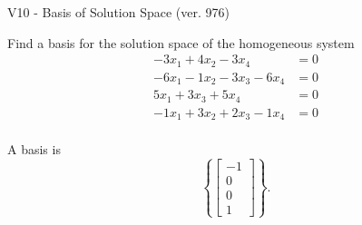 \begin{exercise}
  \begin{exerciseTitle}V10 - Basis of Solution Space (ver. 976)\end{exerciseTitle}
  \begin{exerciseStatement}
    Find a basis for the solution space of the homogeneous system 
\begin{align*}
 -3 x_ 1 + 4 x_ 2 -3 x_ 4 &= 0  \\ 
  -6 x_ 1 -1 x_ 2 -3 x_ 3 -6 x_ 4 &= 0  \\ 
  5 x_ 1 + 3 x_ 3 + 5 x_ 4 &= 0  \\ 
  -1 x_ 1 + 3 x_ 2 + 2 x_ 3 -1 x_ 4 &= 0  \\ 
 \end{align*}


 
  \end{exerciseStatement}

  \begin{exerciseAnswer}
   A basis is   
\[\left\{\left[\begin{array}{c}
-1 \\
0 \\
0 \\
1
\end{array}\right]\right\}.\]

  


  \end{exerciseAnswer}
\end{exercise}